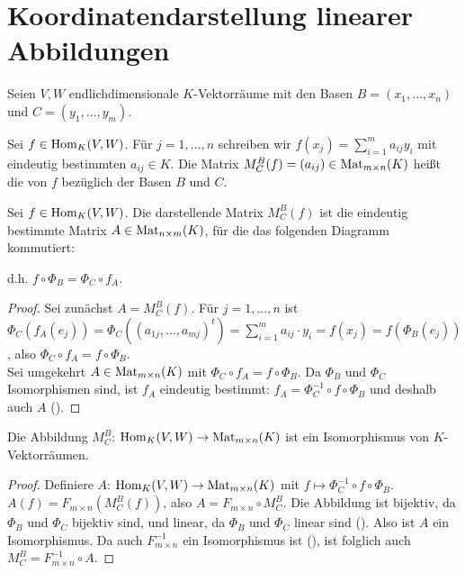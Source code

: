 \section{Koordinatendarstellung linearer Abbildungen}

Seien $V,W$ endlichdimensionale $K$-Vektorräume mit den Basen $B=(x_1,...,x_n)$ und $C=(y_1,...,y_m)$.

\begin{definition}
	Sei $f\in \operatorname{Hom}_K(V,W)$. Für $j=1,...,n$ schreiben wir $f(x_j)=\sum_{
		i=1}^m a_{ij}y_i$ mit eindeutig bestimmten $a_{ij}\in K$. Die Matrix $M_C^B(f)=(a_{ij})\in \operatorname{Mat}_{m\times n}(K)$ 
	heißt die  von $f$ bezüglich der Basen $B$ und $C$.
\end{definition}

\begin{proposition}
	Sei $f\in \operatorname{Hom}_K(V,W)$. Die darstellende Matrix $M_C^B(f)$ ist die eindeutig bestimmte Matrix $A\in 
	\operatorname{Mat}_{n\times m}(K)$, für die das folgenden Diagramm kommutiert: \\
	\begin{center}\end{center}
	d.h. $f\circ \Phi_B=\Phi_C\circ f_A$.
\end{proposition}
\begin{proof}
	Sei zunächst $A=M_C^B(f)$. Für $j=1,...,n$ ist $\Phi_C(f_A(e_j))=\Phi_C((a_{1j},...,a_{mj})^t)=\sum_{i=1}^m 
	a_{ij}\cdot y_i=f(x_j)=f(\Phi_B(e_j))$, also $\Phi_C\circ f_A=f \circ \Phi_B$. \\
	Sei umgekehrt $A\in \operatorname{Mat}_{m\times n}(K)$ mit $\Phi_C\circ f_A=f\circ\Phi_B$. Da $\Phi_B$ und $\Phi_C$ Isomorphismen 
	sind, ist $f_A$ eindeutig bestimmt: $f_A=\Phi_C^{-1}\circ f \circ \Phi_B$ und deshalb auch $A$ ().
\end{proof}

\begin{conclusion}
	Die Abbildung $M_C^B$: $\operatorname{Hom}_K(V,W)\to \operatorname{Mat}_{m\times n}(K)$ ist ein Isomorphismus von $K$-Vektorräumen.
\end{conclusion}
\begin{proof}
	Definiere $A$: $\operatorname{Hom}_K(V,W)\to \operatorname{Mat}_{m\times n}(K)$ mit $f\mapsto \Phi_C^{-1}\circ f \circ \Phi_B$. $A(f)=F_{m\times n}
	(M_C^B(f))$, also $A=F_{m\times n}\circ M_C^B$. Die Abbildung ist bijektiv, da $\Phi_B$ und $\Phi_C$ bijektiv sind, 
	und linear, da $\Phi_B$ und $\Phi_C$ linear sind (). Also ist $A$ ein Isomorphismus. Da auch $F_{m\times n}^{-1}$ ein 
	Isomorphismus ist (), ist folglich auch $M_C^B=F_{m\times n}^{-1}\circ A$.
\end{proof}

